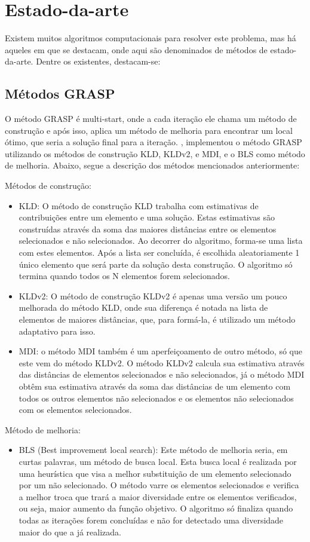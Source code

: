 \documentclass[12pt]{article}
\begin{document}
\section{Estado-da-arte}

Existem muitos algoritmos computacionais para resolver este problema, mas há aqueles em que se destacam, onde aqui são denominados de métodos de estado-da-arte. Dentre os existentes, destacam-se:

\subsection{Métodos GRASP}
O método GRASP é multi-start, onde a cada iteração ele chama um método de construção e após isso, aplica um método de melhoria para encontrar um local ótimo, que seria a solução final para a iteração. \cite{silva2004experimental}, implementou o método GRASP utilizando os métodos de construção KLD, KLDv2, e MDI, e o BLS como método de melhoria. Abaixo, segue a descrição dos métodos mencionados anteriormente:

Métodos de construção:
\begin{itemize}
    \item KLD: O método de construção KLD trabalha com estimativas de contribuições entre um elemento e uma solução. Estas estimativas são construídas através da soma das maiores distâncias entre os elementos selecionados e não selecionados. Ao decorrer do algoritmo, forma-se uma lista com estes elementos. Após a lista ser concluída, é escolhida aleatoriamente 1 único elemento que será parte da solução desta construção. O algoritmo só termina quando todos os N elementos forem selecionados.
    \item KLDv2: O método de construção KLDv2 é apenas uma versão um pouco melhorada do método KLD, onde sua diferença é notada na lista de elementos de maiores distâncias, que, para formá-la, é utilizado um método adaptativo para isso.
    \item MDI: o método MDI também é um aperfeiçoamento de outro método, só que este vem do método KLDv2. O método KLDv2 calcula sua estimativa através das distâncias de elementos selecionados e não selecionados, já o método MDI obtêm sua estimativa através da soma das distâncias de um elemento com todos os outros elementos não selecionados e os elementos não selecionados com os elementos selecionados.
\end{itemize}

Método de melhoria:
\begin{itemize}
    \item BLS (Best improvement local search): Este método de melhoria seria, em curtas palavras, um método de busca local. Esta busca local é realizada por uma heurística que visa a melhor substituição de um elemento selecionado por um não selecionado. O método varre os elementos selecionados e verifica a melhor troca que trará a maior diversidade entre os elementos verificados, ou seja, maior aumento da função objetivo. O algoritmo só finaliza quando todas as iterações forem concluídas e não for detectado uma diversidade maior do que a já realizada.
\end{itemize}
\end{document}
